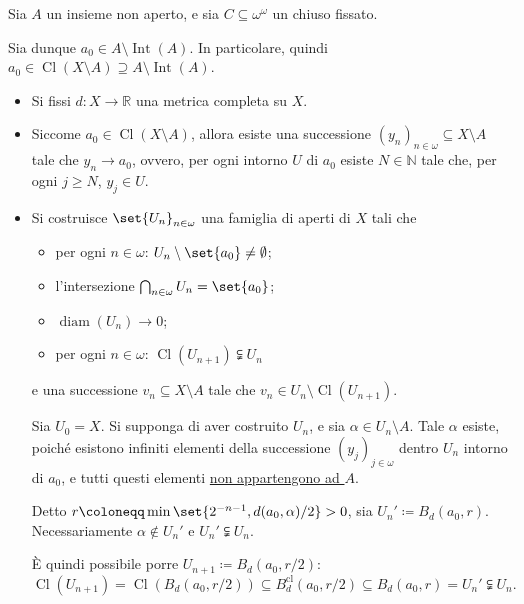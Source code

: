 \documentclass{article}
\newcommand{\1}{\mathds{1}}
\newcommand{\R}{\mathds{R}}
\newcommand{\N}{\mathds{N}}
\begin{document}
Sia \(A\) un insieme non aperto, e sia \(C \subseteq \omega^{\omega}\) un chiuso fissato.

Sia dunque \(a_{0} \in A\setminus \operatorname{Int}(A)\). In particolare, quindi \(a_{0} \in \operatorname{Cl}(X\setminus A) \supseteq A\setminus \operatorname{Int}(A)\).

\begin{itemize}
\item Si fissi \(d:X\to \R\) una metrica completa su \(X\).
\item Siccome \(a_{0} \in \operatorname{Cl}(X\setminus A)\), allora esiste una successione \((y_{n})_{n \in \omega} \subseteq X\setminus A\) tale che \(y_{n}\to a_{0}\), ovvero, per ogni intorno \(U\) di \(a_{0}\) esiste \(N \in \N\) tale che, per ogni \(j\ge N\), \(y_{j} \in U\).
\item Si costruisce \(\set{U_{n}}_{n \in \omega}\) una famiglia di aperti di \(X\) tali che
\begin{itemize}
\item per ogni \(n \in \omega\): \(U_{n}\setminus \set{a_{0}}\neq \emptyset\);
\item l'intersezione \(\bigcap_{n \in \omega} U_{n} = \set{a_{0}}\);
\item \(\operatorname{diam}(U_{n})\to 0\);
\item per ogni \(n \in \omega\): \(\operatorname{Cl}(U_{n+1}) \subsetneqq U_{n}\)
\end{itemize}
e una successione \(v_{n} \subseteq X\setminus A\) tale che \(v_{n} \in U_{n}\setminus \operatorname{Cl}(U_{n+1})\).

Sia \(U_{0} = X\). Si supponga di aver costruito \(U_{n}\), e sia \(\alpha \in U_{n}\setminus A\). Tale \(\alpha\) esiste, poiché esistono infiniti elementi della successione \((y_{j})_{j \in \omega}\) dentro \(U_{n}\) intorno di \(a_{0}\), e tutti questi elementi \uline{non appartengono ad \(A\)}.

Detto \(r\coloneqq\min\set{2^{-n-1}, d(a_{0},\alpha)/2}>0\), sia \(U_{n}'\coloneqq B_{d}(a_{0},r)\). Necessariamente \(\alpha\notin U_{n}'\) e \(U_{n}' \subsetneqq U_{n}\).

È quindi possibile porre \(U_{n+1}\coloneqq B_{d}(a_{0},r/2)\):
\begin{equation*}
  	\operatorname{Cl}(U_{n+1}) = \operatorname{Cl} \left(B_{d}(a_{0},r/2)\right) \subseteq B_{d}^{\text{cl}}(a_{0},r/2) \subseteq B_{d}(a_{0},r) = U_{n}' \subsetneqq U_{n}.
\end{equation*}


\end{itemize}
\end{document}

